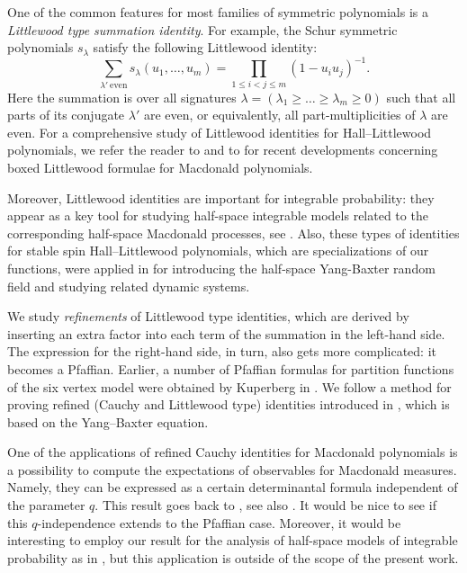 \documentclass[ALCO,Unicode]{cedram}
\begin{document}
One of the common features 
for most
families of symmetric polynomials
is a \emph{Littlewood type summation identity}. For example, the Schur symmetric polynomials $s_{\lambda}$ satisfy the following Littlewood identity:
\begin{equation*}
\sum_{\lambda'\ \text{even}} s_{\lambda}(u_1, \dots, u_m)
=
\prod_{1 \leq i<j\leq m}
(1 - u_i u_j)^{-1}.
\end{equation*}
Here the summation is over all signatures $\lambda=(\lambda_1\ge \ldots\ge \lambda_m\ge0 )$ such that all parts of its conjugate $\lambda'$ are even, or equivalently, all part-multiplicities of $\lambda$ are even.
For a comprehensive study of Littlewood identities for
Hall–Littlewood polynomials, we refer the reader to \cite[Ch. III]{Mac95} and to \cite{War06,RW21} for recent developments concerning boxed Littlewood formulae for
Macdonald polynomials.

Moreover, Littlewood identities are important for integrable probability: they appear as a key tool for studying half-space integrable models related to the corresponding half-space Macdonald processes, see \cite{BBC20,BBCW18,BZ19}. Also, these types of identities for stable spin Hall--Littlewood polynomials, which are specializations of our functions, were applied in \cite{CD21} for introducing the half-space Yang-Baxter random field and studying related dynamic systems.

We study \emph{refinements} of Littlewood type identities,
which are derived by inserting an extra factor
into each term of the summation in the left-hand side.
The expression for the right-hand side, in turn, also gets more complicated: it becomes a Pfaffian. Earlier, a number of Pfaffian formulas for partition functions of the six vertex model were obtained by Kuperberg in \cite{Kup02}. We follow a method for proving refined (Cauchy and Littlewood type) identities introduced in \cite{WZJ16}, which is based on the Yang--Baxter equation.

One of the applications of refined Cauchy identities for Macdonald polynomials is a possibility to compute the expectations of observables for Macdonald
measures. Namely, they can be expressed as a certain determinantal formula independent of the parameter $q$.
This result goes back to 
\cite{KN99}, see also \cite{War08,Bor18,Pet21}.
It would be nice to see if this $q$-independence extends to the Pfaffian case. Moreover, it would be interesting to employ our result for the analysis of half-space models of integrable probability as in \cite{BBC20,BBCW18,BZ19}, but this application is outside of the scope of the present work.
\end{document}
